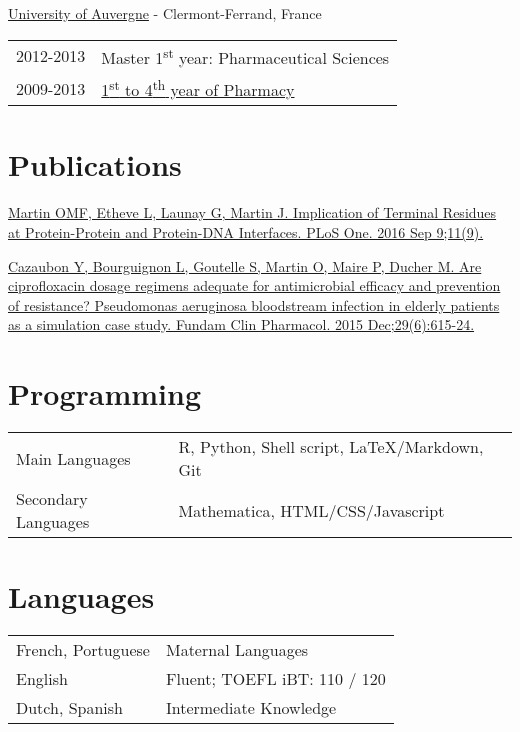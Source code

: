 \documentclass[a4paper, 10pt]{article} %
\begin{document}
\href{http://www.u-clermont1.fr/}{University of Auvergne} - Clermont-Ferrand, France

\begin{tabular}{ll}
\textsc{2012-2013} & Master 1\textsuperscript{st} year: Pharmaceutical Sciences \\
\textsc{2009-2013} & \href{http://pharmacie.u-clermont1.fr/}{1\textsuperscript{st} to 4\textsuperscript{th} year of Pharmacy}
\end{tabular}


\section{Publications}

\href{http://www.ncbi.nlm.nih.gov/pubmed/27611671}{Martin OMF, Etheve L, Launay G, Martin J. Implication of Terminal Residues at Protein-Protein and Protein-DNA Interfaces. PLoS One. 2016 Sep 9;11(9).}

\href{http://www.ncbi.nlm.nih.gov/pubmed/26406268}{Cazaubon Y, Bourguignon L, Goutelle S, Martin O, Maire P, Ducher M. Are ciprofloxacin dosage regimens adequate for antimicrobial efficacy and prevention of resistance? Pseudomonas aeruginosa bloodstream infection in elderly patients as a simulation case study. Fundam Clin Pharmacol. 2015 Dec;29(6):615-24.}


\section{Programming}
\begin{tabular}{ll}
Main Languages & R, Python, Shell script, \LaTeX/Markdown, Git \\
Secondary Languages & Mathematica, HTML/CSS/Javascript \\
\end{tabular}


\section{Languages}
\begin{tabular}{ll}
French, Portuguese & Maternal Languages\\
English & Fluent; TOEFL iBT: 110 / 120\\
Dutch, Spanish & Intermediate Knowledge \\
\end{tabular}
\end{document}
